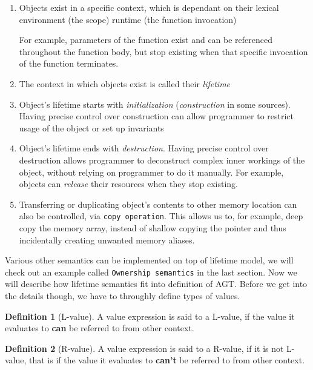 \documentclass[times, utf8, diplomski]{fer}
\theoremstyle{definition}
\newtheorem{definition}{Definition}[]
\begin{document}
\begin{enumerate}
    \item Objects exist in a specific context, which is dependant on their 
        \subitem lexical environment (the scope)
        \subitem runtime (the function invocation)

        For example, parameters of the function exist and can be referenced throughout the function body,
        but stop existing when that specific invocation of the function terminates. 

    \item The context in which objects exist is called their \textit{lifetime}
    \item Object's lifetime starts with \textit{initialization} (\textit{construction} in some sources).
        \subitem Having precise control over construction can allow programmer
                to restrict usage of the object or set up invariants
    \item Object's lifetime ends with \textit{destruction}.
        Having precise control over destruction allows programmer to
        deconstruct complex inner workings of the object, without relying on programmer to do it manually.
        For example, objects can \textit{release} their resources when they stop existing.
    \item Transferring or duplicating object's contents to other memory location can also be controlled,
        via \texttt{copy operation}. This allows us to, for example, deep copy the memory array, 
        instead of shallow copying the pointer and thus incidentally creating unwanted memory aliases.
\end{enumerate}

Various other semantics can be implemented on top of lifetime model, we will check out an example called
\texttt{Ownership semantics} in the last section. Now we will describe how lifetime semantics fit into
definition of AGT. Before we get into the details though, we have to throughly define types of values.

\begin{definition}[L-value]
A value expression is said to a L-value, 
if the value it evaluates to \textbf{can} be referred to from other context.
\end{definition}

\begin{definition}[R-value]
A value expression is said to a R-value, if it is not L-value, that is
if the value it evaluates to \textbf{can't} be referred to from other context.
\end{definition}
\end{document}
